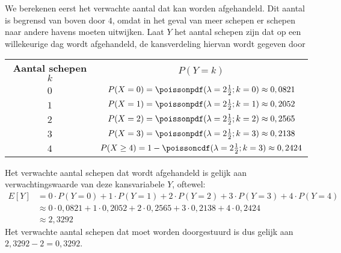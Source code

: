 \begin{enumerate}[label=(\alph*)]
{        We berekenen eerst het verwachte aantal dat kan worden afgehandeld.
        Dit aantal is begrensd van boven door $4$, omdat in het geval van meer schepen er schepen naar andere havens moeten uitwijken.
        Laat $Y$ het aantal schepen zijn dat op een willekeurige dag wordt afgehandeld, de kansverdeling hiervan wordt gegeven door
        \begin{center}
            \begin{tabular}{cc}
                \toprule
                    {\bfseries Aantal schepen $k$} & $P(Y=k)$\\
                \cmidrule{1-1} \cmidrule{2-2}
                    $0$ & $P(X=0) = \poissonpdf(\lambda=2\frac{1}{2}; k=0) \approx 0,0821$ \\
                    $1$ & $P(X=1) = \poissonpdf(\lambda=2\frac{1}{2}; k=1) \approx 0,2052$ \\
                    $2$ & $P(X=2) = \poissonpdf(\lambda=2\frac{1}{2}; k=2) \approx 0,2565$ \\
                    $3$ & $P(X=3) = \poissonpdf(\lambda=2\frac{1}{2}; k=3) \approx 0,2138$ \\
                    $4$ & $P(X \ge 4) = 1-\poissoncdf(\lambda=2\frac{1}{2}; k=3) \approx 0,2424$ \\
                \bottomrule
            \end{tabular}
        \end{center}
        Het verwachte aantal schepen dat wordt afgehandeld is gelijk aan verwachtingswaarde van deze kansvariabele $Y$, oftewel:
        \begin{align*}
            E[Y]    &= 0 \cdot P(Y=0) + 1 \cdot P(Y=1) + 2 \cdot P(Y=2) + 3 \cdot P(Y = 3) + 4 \cdot P(Y = 4) \\
                    &\approx 0 \cdot 0,0821 + 1 \cdot 0,2052 + 2 \cdot 0,2565 + 3 \cdot 0,2138 + 4 \cdot 0,2424 \\
                    &\approx 2,3292
        \end{align*}
        Het verwachte aantal schepen dat moet worden doorgestuurd is dus gelijk aan $2,3292 - 2 = 0,3292$.
    }


\end{enumerate}
